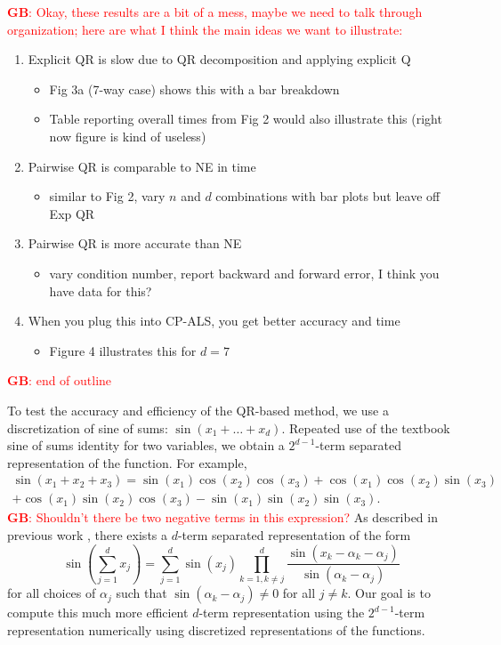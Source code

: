 \documentclass{article}
\newcommand{\GB}[1]{\textcolor{red}{\textbf{GB}: #1}}
\begin{document}
\GB{Okay, these results are a bit of a mess, maybe we need to talk through organization; here are what I think the main ideas we want to illustrate:}
\begin{enumerate}
	\item Explicit QR is slow due to QR decomposition and applying explicit Q
	\begin{itemize}
		\item Fig 3a (7-way case) shows this with a bar breakdown
		\item Table reporting overall times from Fig 2 would also illustrate this (right now figure is kind of useless)
	\end{itemize}
	\item Pairwise QR is comparable to NE in time
	\begin{itemize}
		\item similar to Fig 2, vary $n$ and $d$ combinations with bar plots but leave off Exp QR
	\end{itemize}
	\item Pairwise QR is more accurate than NE
	\begin{itemize}
		\item vary condition number, report backward and forward error, I think you have data for this?
	\end{itemize}
	\item When you plug this into CP-ALS, you get better accuracy and time
	\begin{itemize}
		\item Figure 4 illustrates this for $d=7$
	\end{itemize}
\end{enumerate}
\GB{end of outline}


To test the accuracy and efficiency of the QR-based method, we use a discretization of sine of sums: $\sin(x_1+\dots+ x_d)$.
Repeated use of the textbook sine of sums identity for two variables, we obtain a $2^{d-1}$-term separated representation of the function.
For example, 
\begin{equation*}
\begin{split}
\sin(x_1+x_2+x_3) = \sin(x_1)\cos(x_2)\cos(x_3)+\cos(x_1)\cos(x_2)\sin(x_3) \\
+\cos(x_1)\sin(x_2)\cos(x_3) - \sin(x_1)\sin(x_2)\sin(x_3).
\end{split}
\end{equation*}
\GB{Shouldn't there be two negative terms in this expression?}
As described in previous work \cite{BM02,MVLB23}, there exists a $d$-term separated representation of the form
$$\sin\left(\sum^d_{j=1}x_j\right) = \sum^d_{j=1}\sin(x_j)\prod^d_{k=1,k\neq j}\frac{\sin(x_k - \alpha_k -\alpha_j)}{\sin(\alpha_k - \alpha_j)}$$
for all choices of  ${\alpha_j}$ such that $\sin(\alpha_k - \alpha_j) \neq 0$ for all $j \neq k$.
Our goal is to compute this much more efficient $d$-term representation using the $2^{d-1}$-term representation numerically using discretized representations of the functions.
\end{document}
